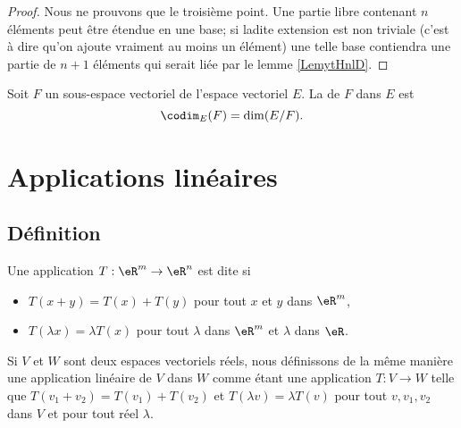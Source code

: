 \begin{proof}
    Nous ne prouvons que le troisième point. Une partie libre contenant \( n\) éléments peut être étendue en une base; si ladite extension est non triviale (c'est à dire qu'on ajoute vraiment au moins un élément) une telle base contiendra une partie de \( n+1\) éléments qui serait liée par le lemme \ref{LemytHnlD}.
\end{proof}

Soit \( F\) un sous-espace vectoriel de l'espace vectoriel \( E\). La  de \( F\) dans \( E\) est
\begin{equation}
    \codim_E(F)=\dim(E/F).
\end{equation}

\section{Applications linéaires}

\subsection{Définition}

\begin{definition}
	Une application $T: \eR^m\to\eR^n$ est dite  si 
\begin{itemize}
\item $T(x+y)=T(x)+T(y)$ pour tout $x$ et $y$ dans $\eR^m$,  
\item $T(\lambda x)=\lambda T(x)$ pour tout $\lambda$ dans $\eR^m$ et $\lambda$ dans $\eR$.
\end{itemize}
\end{definition}

Si $V$ et $W$ sont deux espaces vectoriels réels, nous définissons de la même manière une application linéaire de $V$ dans $W$ comme étant une application $T\colon V\to W$ telle que $T(v_1+v_2)=T(v_1)+T(v_2)$ et $T(\lambda v)=\lambda T(v)$ pour tout $v,v_1,v_2$ dans $V$ et pour tout réel $\lambda$.

